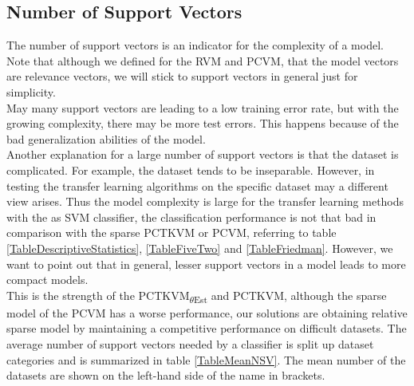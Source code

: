 \subsection{Number of Support Vectors}\label{EmSubSecNumberSV}
The number of support vectors is an indicator for the complexity of a model. 
Note that although we defined for the \acs{RVM} and \acs{PCVM}, that the model vectors are relevance vectors, we will stick to support vectors in general just for simplicity.\\
May many support vectors are leading to a low training error rate, but with the growing complexity, there may be more test errors. 
This happens because of the bad generalization abilities of the model.\cite[p. 81]{Igual.2017}\\
Another explanation for a large number of support vectors is that the dataset is complicated. For example, the dataset tends to be inseparable.\cite[p. 78;86]{Abe.2010}
However, in testing the transfer learning algorithms on the specific dataset may a different view arises. 
Thus the model complexity is large for the transfer learning methods with the as \acs{SVM} classifier, the classification performance is not that bad in comparison with the sparse \acs{PCTKVM} or \acs{PCVM}, referring to table \ref{TableDescriptiveStatistics}, \ref{TableFiveTwo} and \ref{TableFriedman}.
However, we want to point out that in general, lesser support vectors in a model leads to more compact models.\cite[p. 349]{Bishop.2009}\\
This is the strength of the \acs{PCTKVM}\textsubscript{$\theta$Est} and \acs{PCTKVM}, although the sparse model of the \acs{PCVM} has a worse performance, our solutions are obtaining relative sparse model by maintaining a competitive performance on difficult datasets.
The average number of support vectors needed by a classifier is split up dataset categories and is summarized in table \ref{TableMeanNSV}. 
The mean number of the datasets are shown on the left-hand side of the name in brackets.
\begin{table}[h]
	\centering
\end{table}
\FloatBarrier
